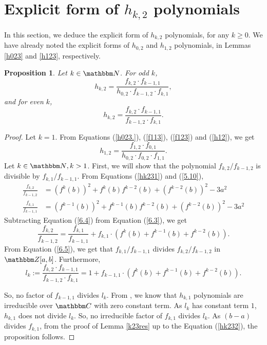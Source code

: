 \documentclass[reqno]{amsart}
\renewcommand{\eqref}[1]{(\ref{#1})}
\numberwithin{equation}{section}
\theoremstyle{plain}
\newtheorem{proposition}[theorem]{Proposition}
\theoremstyle{definition}
\theoremstyle{definition}
\newcommand{\Z}{{\mathbbm Z}}
\newcommand{\C}{{\mathbbm C}}
\newcommand{\N}{{\mathbbm N}}
\begin{document}
\section{Explicit form of $h_{k,2}$ polynomials}\label{explicit}
In this section, we deduce the explicit form of $h_{k,2}$ polynomials, for any $k\geq 0$. We have already noted the explicit forms of $h_{0,2}$ and $h_{1,2}$ polynomials, in Lemmas \ref{h023} and \ref{h123}, respectively.
\begin{proposition}\label{exp}
    Let $k\in \N$. For odd $k$,
    \begin{equation}
        h_{k,2} = \frac{f_{k,2}\cdot f_{k-1,1}}{h_{0,2}\cdot f_{k-1,2}\cdot f_{k,1}},
    \end{equation}
    and for even $k$,
    \begin{equation}
        h_{k,2} = \frac{f_{k,2}\cdot f_{k-1,1}}{f_{k-1,2}\cdot f_{k,1}}.
    \end{equation}
\end{proposition}
\begin{proof}
    Let $k=1$. From Equations \eqref{h023.}, \eqref{f113}, \eqref{f123} and \eqref{h12}, we get 
    \begin{equation}
        h_{1,2} = \frac{f_{1,2}\cdot f_{0,1}}{h_{0,2}\cdot f_{0,2}\cdot f_{1,1}}.
    \end{equation}
    Let $k\in \N, k>1$. First, we will show that the polynomial $f_{k,2}/f_{k-1,2}$ is divisible by $f_{k,1}/f_{k-1,1}$. From Equations \eqref{hk231} and \eqref{5.10},
    \begin{align}
        \frac{f_{k,2}}{f_{k-1,2}} & = (f^{k}(b))^{2} + f^{k}(b)f^{k-2}(b) + (f^{k-2}(b))^{2} - 3a^{2} \label{6.3}\\
        \frac{f_{k,1}}{f_{k-1,1}} & = (f^{k-1}(b))^{2} + f^{k-1}(b)f^{k-2}(b) + (f^{k-2}(b))^{2} - 3a^{2}\label{6.4}
    \end{align}
    Subtracting Equation \eqref{6.4} from Equation \eqref{6.3}, we get
    \begin{equation}\label{6.5}
        \frac{f_{k,2}}{f_{k-1,2}} =  \frac{f_{k,1}}{f_{k-1,1}} + f_{k,1} \cdot (f^{k}(b) + f^{k-1}(b) + f^{k-2}(b)).
    \end{equation}
    From Equation \eqref{6.5}, we get that $f_{k,1}/f_{k-1,1}$ divides $f_{k,2}/f_{k-1,2}$ in $\Z[a,b]$. Furthermore, 
    \begin{equation}
        l_{k}:= \frac{f_{k,2}\cdot f_{k-1,1}}{f_{k-1,2}\cdot f_{k,1}} = 1 + f_{k-1,1} \cdot (f^{k}(b) + f^{k-1}(b) + f^{k-2}(b)).
    \end{equation}
    
    So, no factor of $f_{k-1,1}$ divides $l_{k}$. From \cite{Pat23}, we know that $h_{k,1}$ polynomials are irreducible over $\C$ with zero constant term. As $l_{k}$ has constant term $1$, $h_{k,1}$ does not divide $l_{k}$. So, no irreducible factor of $f_{k,1}$ divides $l_{k}$. As $(b-a)$ divides $f_{k,1}$, from the proof of Lemma \ref{k23res} up to the Equation \eqref{hk232}, the proposition follows.
\end{proof}
\end{document}
